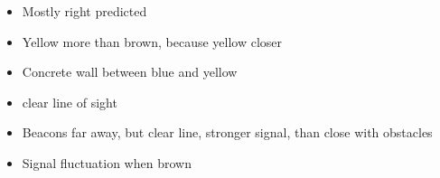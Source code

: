 
\begin{itemize}
\item Mostly right predicted
\item Yellow more than brown, because yellow closer
\item Concrete wall between blue and yellow
\item clear line of sight
\item Beacons far away, but clear line, stronger signal, than close with obstacles
\item Signal fluctuation when brown
\end{itemize}
